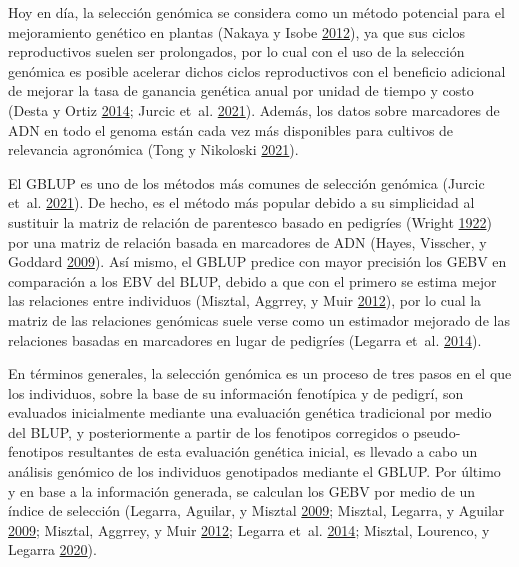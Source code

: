 \documentclass[11pt,spanish,a4paper,oneside,]{book} %
\begin{document}
Hoy en día, la selección genómica se considera como un método potencial para el mejoramiento genético en plantas (Nakaya y Isobe \protect\hyperlink{ref-cite:6}{2012}), ya que sus ciclos reproductivos suelen ser prolongados, por lo cual con el uso de la selección genómica es posible acelerar dichos ciclos reproductivos con el beneficio adicional de mejorar la tasa de ganancia genética anual por unidad de tiempo y costo (Desta y Ortiz \protect\hyperlink{ref-cite:10}{2014}; Jurcic et~al. \protect\hyperlink{ref-cite:11}{2021}). Además, los datos sobre marcadores de ADN en todo el genoma están cada vez más disponibles para cultivos de relevancia agronómica (Tong y Nikoloski \protect\hyperlink{ref-cite:7}{2021}).

El GBLUP es uno de los métodos más comunes de selección genómica (Jurcic et~al. \protect\hyperlink{ref-cite:11}{2021}). De hecho, es el método más popular debido a su simplicidad al sustituir la matriz de relación de parentesco basado en pedigríes (Wright \protect\hyperlink{ref-cite:12}{1922}) por una matriz de relación basada en marcadores de ADN (Hayes, Visscher, y Goddard \protect\hyperlink{ref-cite:13}{2009}). Así mismo, el GBLUP predice con mayor precisión los GEBV en comparación a los EBV del BLUP, debido a que con el primero se estima mejor las relaciones entre individuos (Misztal, Aggrrey, y Muir \protect\hyperlink{ref-cite:14}{2012}), por lo cual la matriz de las relaciones genómicas suele verse como un estimador mejorado de las relaciones basadas en marcadores en lugar de pedigríes (Legarra et~al. \protect\hyperlink{ref-cite:15}{2014}).

En términos generales, la selección genómica es un proceso de tres pasos en el que los individuos, sobre la base de su información fenotípica y de pedigrí, son evaluados inicialmente mediante una evaluación genética tradicional por medio del BLUP, y posteriormente a partir de los fenotipos corregidos o pseudo-fenotipos resultantes de esta evaluación genética inicial, es llevado a cabo un análisis genómico de los individuos genotipados mediante el GBLUP. Por último y en base a la información generada, se calculan los GEBV por medio de un índice de selección (Legarra, Aguilar, y Misztal \protect\hyperlink{ref-cite:17}{2009}; Misztal, Legarra, y Aguilar \protect\hyperlink{ref-cite:16}{2009}; Misztal, Aggrrey, y Muir \protect\hyperlink{ref-cite:14}{2012}; Legarra et~al. \protect\hyperlink{ref-cite:15}{2014}; Misztal, Lourenco, y Legarra \protect\hyperlink{ref-cite:18}{2020}).
\end{document}
